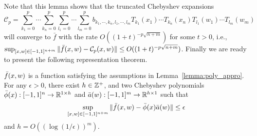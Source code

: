 Note that this lemma shows that the truncated Chebyshev expansions
$$\mathcal{C}_p=\sum_{k_1=0}^p\cdots\sum_{k_n=0}^p\sum_{l_1=0}^p\cdots\sum_{l_m=0}^p
b_{k_1,\cdots,k_n,l_1,\cdots,l_m}T_{k_1}(x_1)\cdots T_{k_n}(x_n)T_{l_1}(w_1)\cdots T_{l_m}(w_m)$$
will converge to $\bar{f}$ with the rate $O((1+t)^{-p\sqrt{n+m}})$ for some $t>0$, i.e., $\sup_{[ x, w]\in[-1,1]^{n+m}}\|\bar{f}( x, w)-\mathcal{C}_p( x, w)\|\leq O((1+t)^{-p\sqrt{n+m}})$. Finally we are ready to present the following representation theorem.

\begin{theorem}
\label{thm:representation}
$\bar{f}( x, w)$ is a function satisfying the assumptions in Lemma~\ref{lemma:poly_appro}. For any $\epsilon>0$, there exist $h\in\mathbb{Z}^+$, and two Chebyshev polynomials $\bar{\phi}( x):[-1,1]^n\rightarrow\mathbb{R}^{1\times h}$ and  $\bar{ a}( w):[-1,1]^m\rightarrow\mathbb{R}^{h\times 1}$ such that 
$$\sup_{[ x, w]\in[-1,1]^{n+m}}\|\bar{f}( x, w)-\bar{\phi}( x) \bar{ a}( w)\|\leq\epsilon$$
and $h=O((\log(1/\epsilon))^m)$.
\end{theorem}
